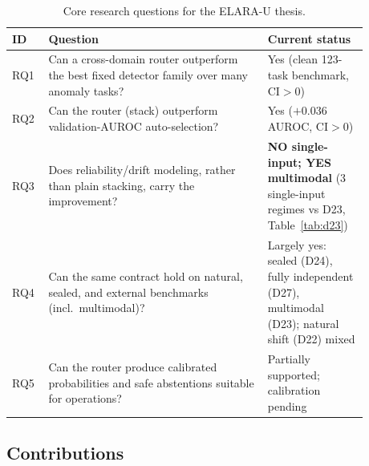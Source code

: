 \documentclass[11pt,titlepage]{article}
\begin{document}
\begin{table}[H]
\centering
\caption{Core research questions for the ELARA-U thesis.}
\label{tab:rq}
\small
\begin{tabular}{L{0.08\linewidth}L{0.56\linewidth}L{0.24\linewidth}}
\toprule
\textbf{ID} & \textbf{Question} & \textbf{Current status} \\
\midrule
RQ1 & Can a cross-domain router outperform the best fixed detector family over many anomaly tasks? & Yes (clean 123-task benchmark, CI$>$0) \\
RQ2 & Can the router (stack) outperform validation-AUROC auto-selection? & Yes ($+0.036$ AUROC, CI$>$0) \\
RQ3 & Does reliability/drift modeling, rather than plain stacking, carry the improvement? & \textbf{NO single-input; YES multimodal} (3 single-input regimes vs D23, Table~\ref{tab:d23}) \\
RQ4 & Can the same contract hold on natural, sealed, and external benchmarks (incl.\ multimodal)? & Largely yes: sealed (D24), fully independent (D27), multimodal (D23); natural shift (D22) mixed \\
RQ5 & Can the router produce calibrated probabilities and safe abstentions suitable for operations? & Partially supported; calibration pending \\
\bottomrule
\end{tabular}
\end{table}

\subsection{Contributions}
\end{document}
